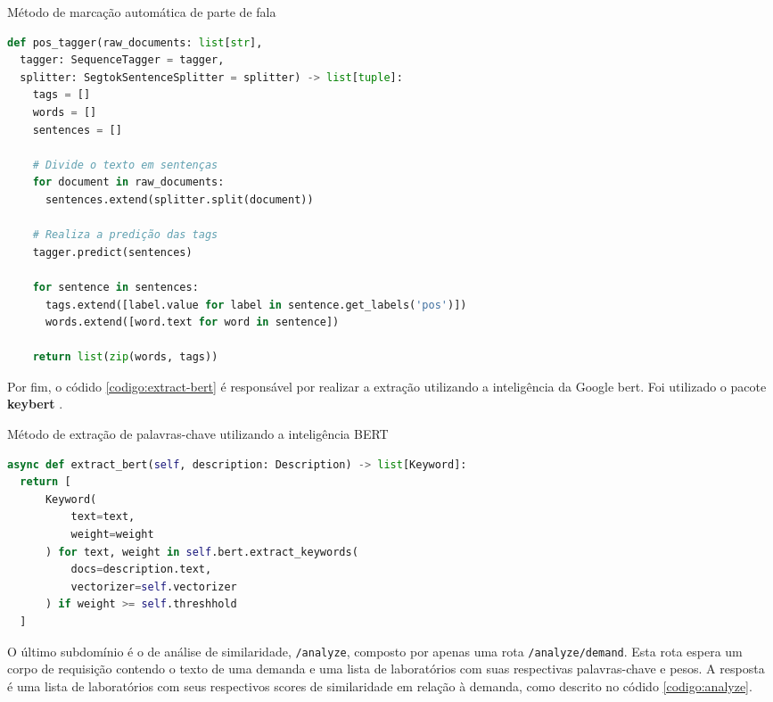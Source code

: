 \begin{sourcecode}[htb]
  \caption{\label{codigo:pos-tagger}Método de marcação automática de parte de fala}
  \begin{lstlisting}[frame=single, language=Python]
def pos_tagger(raw_documents: list[str], 
  tagger: SequenceTagger = tagger, 
  splitter: SegtokSentenceSplitter = splitter) -> list[tuple]:
    tags = []
    words = []
    sentences = []

    # Divide o texto em sentenças
    for document in raw_documents:
      sentences.extend(splitter.split(document))

    # Realiza a predição das tags
    tagger.predict(sentences)

    for sentence in sentences:
      tags.extend([label.value for label in sentence.get_labels('pos')])
      words.extend([word.text for word in sentence])

    return list(zip(words, tags))
\end{lstlisting}
  \fonte{}
\end{sourcecode}

Por fim, o códido \ref{codigo:extract-bert} é responsável por realizar a extração utilizando a inteligência da Google \gls{bert}. Foi utilizado o pacote \textbf{keybert} \cite{grootendorst2020keybert}.

\begin{sourcecode}[htb]
  \caption{\label{codigo:extract-bert}Método de extração de palavras-chave utilizando a inteligência BERT}
  \begin{lstlisting}[frame=single, language=Python]
async def extract_bert(self, description: Description) -> list[Keyword]:
  return [
      Keyword(
          text=text, 
          weight=weight
      ) for text, weight in self.bert.extract_keywords(
          docs=description.text, 
          vectorizer=self.vectorizer
      ) if weight >= self.threshhold
  ]
\end{lstlisting}
  \fonte{}
\end{sourcecode}

O último subdomínio é o de análise de similaridade, \texttt{/analyze}, composto por apenas uma rota \texttt{/analyze/demand}. Esta rota espera um corpo de requisição contendo o texto de uma demanda e uma lista de laboratórios com suas respectivas palavras-chave e pesos. A resposta é uma lista de laboratórios com seus respectivos scores de similaridade em relação à demanda, como descrito no códido \ref{codigo:analyze}.

